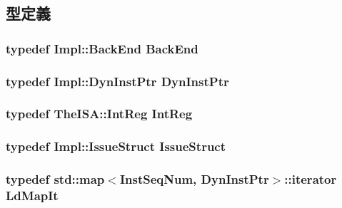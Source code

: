 \subsection{型定義}
\hypertarget{classOzoneLWLSQ_a3de526baa0cbb2b55bf669a6f7bf81cc}{
\subsubsection[{BackEnd}]{\setlength{\rightskip}{0pt plus 5cm}typedef Impl::BackEnd {\bf BackEnd}}}
\label{classOzoneLWLSQ_a3de526baa0cbb2b55bf669a6f7bf81cc}
\hypertarget{classOzoneLWLSQ_a028ce10889c5f6450239d9e9a7347976}{
\subsubsection[{DynInstPtr}]{\setlength{\rightskip}{0pt plus 5cm}typedef Impl::DynInstPtr {\bf DynInstPtr}}}
\label{classOzoneLWLSQ_a028ce10889c5f6450239d9e9a7347976}
\hypertarget{classOzoneLWLSQ_a1355cb78d031430d4d70eb5080267604}{
\subsubsection[{IntReg}]{\setlength{\rightskip}{0pt plus 5cm}typedef TheISA::IntReg {\bf IntReg}}}
\label{classOzoneLWLSQ_a1355cb78d031430d4d70eb5080267604}
\hypertarget{classOzoneLWLSQ_a568c86f6403070f1cb743e994405ba8b}{
\subsubsection[{IssueStruct}]{\setlength{\rightskip}{0pt plus 5cm}typedef Impl::IssueStruct {\bf IssueStruct}}}
\label{classOzoneLWLSQ_a568c86f6403070f1cb743e994405ba8b}
\hypertarget{classOzoneLWLSQ_a8b43ca5318a59872c61492868e50bab6}{
\subsubsection[{LdMapIt}]{\setlength{\rightskip}{0pt plus 5cm}typedef std::map$<${\bf InstSeqNum}, {\bf DynInstPtr}$>$::iterator {\bf LdMapIt}}}
